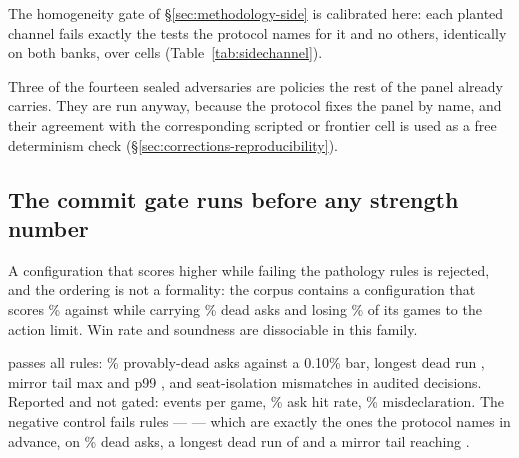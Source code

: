 The homogeneity gate of \S\ref{sec:methodology-side} is calibrated here: each planted channel fails
exactly the tests the protocol names for it and no others, identically on both banks, over
\vsevenSideCells{} cells (Table~\ref{tab:sidechannel}).

Three of the fourteen sealed adversaries are policies the rest of the panel already carries. They are
run anyway, because the protocol fixes the panel by name, and their agreement with the corresponding
scripted or frontier cell is used as a free determinism check
(\S\ref{sec:corrections-reproducibility}).

\subsection{The commit gate runs before any strength number}
\label{sec:protocol-gate}

A configuration that scores higher while failing the pathology rules is rejected, and the ordering is
not a formality: the corpus contains a configuration that scores
\vsevenScoreboardTrapWin\% against \vfour{} while carrying \vsevenScoreboardTrapDead\% dead asks and
losing \vsevenScoreboardTrapLimit\% of its games to the action limit. Win rate and soundness are
dissociable in this family.

\begin{table}[t]\centering
\caption{The commit gate, eight rules, run on training material by design --- it is a soundness check
on self-play behaviour, not a strength claim. The negative control is the configuration the corpus
built to be rejected; a gate that could not reject it would certify nothing about the one it accepts.}
\label{tab:gate}
{\small}
\end{table}

\frozen{} passes all \vsevenGateRules{} rules: \vsevenGateDeadAsks\% provably-dead asks against a
0.10\% bar, longest dead run \vsevenGateLongestDead{}, mirror tail max \vsevenGateTailMax{} and p99
\vsevenGateTailPnn{}, and \vsevenGateSsix{} seat-isolation mismatches in \vsevenGateSsixNodes{}
audited decisions. Reported and not gated: \vsevenGateEvents{} events per game, \vsevenGateAskHit\%
ask hit rate, \vsevenGateMisdecl\% misdeclaration. The negative control fails
\vsevenNegFailCount{} rules --- \vsevenNegFails{} --- which are exactly the ones the protocol names in
advance, on \vsevenNegDeadAsks\% dead asks, a longest dead run of \vsevenNegLongestDead{} and a mirror
tail reaching \vsevenNegTailMax{}.

